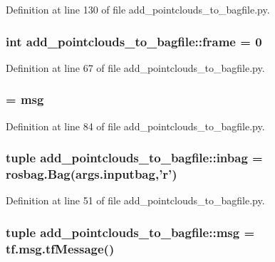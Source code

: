 \-Definition at line 130 of file add\-\_\-pointclouds\-\_\-to\-\_\-bagfile.\-py.

\subsubsection[{frame}]{\setlength{\rightskip}{0pt plus 5cm}int {\bf add\-\_\-pointclouds\-\_\-to\-\_\-bagfile\-::frame} = 0}\label{namespaceadd__pointclouds__to__bagfile_aa3cd47715526802ae03988a17756023c}


\-Definition at line 67 of file add\-\_\-pointclouds\-\_\-to\-\_\-bagfile.\-py.

\subsubsection[{imu}]{ = {\bf msg}}\label{namespaceadd__pointclouds__to__bagfile_a2fa7194e814a8fb414272366736c7072}


\-Definition at line 84 of file add\-\_\-pointclouds\-\_\-to\-\_\-bagfile.\-py.

\subsubsection[{inbag}]{\setlength{\rightskip}{0pt plus 5cm}tuple {\bf add\-\_\-pointclouds\-\_\-to\-\_\-bagfile\-::inbag} = rosbag.\-Bag(args.\-inputbag,'r')}\label{namespaceadd__pointclouds__to__bagfile_ad8dd345cee6d9290060f75ee27a98027}


\-Definition at line 51 of file add\-\_\-pointclouds\-\_\-to\-\_\-bagfile.\-py.

\subsubsection[{msg}]{\setlength{\rightskip}{0pt plus 5cm}tuple {\bf add\-\_\-pointclouds\-\_\-to\-\_\-bagfile\-::msg} = tf.\-msg.\-tf\-Message()}\label{namespaceadd__pointclouds__to__bagfile_a34da84fa8322a694b4fa257d5c06edad}


